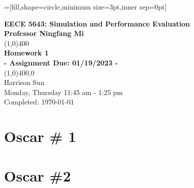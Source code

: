 \documentclass[11]{article}
\begin{document}
=[fill,shape=circle,minimum size=3pt,inner sep=0pt]

\begin{titlepage}
\begin{center}
\vspace*{2cm}
\Large{\textbf{EECE 5643: Simulation and Performance Evaluation}}\\
\Large{\textbf{Professor Ningfang Mi}}\\
\vfill
\line(1,0){400}\\[1mm]
\huge{\textbf{Homework 1}}\\[3mm]
\Large{\textbf{- Assignment Due: 01/19/2023 -}}\\[1mm]
\line(1,0){400,0}\\
\vfill
Harrison Sun\\
Monday, Thursday 11:45 am - 1:25 pm \\
Completed: \today\
\end{center}
\end{titlepage}
\section{Oscar \# 1}



\section{Oscar \#2}

\end{document}
